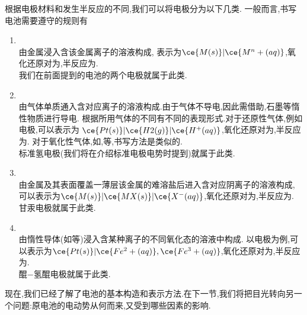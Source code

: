 \documentclass{ctexart}
\begin{document}
\begin{theorem}[6A.2.4 电极的种类]
    根据电极材料和发生半反应的不同,我们可以将电极分为以下几类.
    一般而言,书写电池需要遵守的规则有
    \begin{enumerate}[topsep=0pt,parsep=0pt,itemsep=0pt,partopsep=0pt,label=\tbf{(\arabic*)},leftmargin=*]
        \item {}\\
            由金属浸入含该金属离子的溶液构成,%
            表示为$\ce{M(s)}\vert\ce{M^n+(aq)}$,氧化还原对为,半反应为.\\
            我们在前面提到的电池的两个电极就属于此类.
        \item {}\\
            由气体单质通入含对应离子的溶液构成.由于气体不导电,因此需借助,石墨等惰性物质进行导电.%
            根据所用气体的不同有不同的表现形式.对于还原性气体,例如电极,可以表示为%
            $\ce{Pt(s)}\vert\ce{H2(g)}\vert\ce{H^+(aq)}$,氧化还原对为,半反应为.%
            对于氧化性气体,如,等,书写方法是类似的.\\
            标准氢电极(我们将在介绍标准电极电势时提到)就属于此类.
        \item {}\\
            由金属及其表面覆盖一薄层该金属的难溶盐后进入含对应阴离子的溶液构成,%
            可以表示为$\ce{M(s)}\vert\ce{MX(s)}\vert\ce{X^-(aq)}$,氧化还原对为,半反应为.\\
            甘汞电极就属于此类.
        \item {}\\
            由惰性导体(如等)浸入含某种离子的不同氧化态的溶液中构成.%
            以电极为例,可以表示为$\ce{Pt(s)}\vert\ce{Fe^2+(aq)},\ce{Fe^3+(aq)}$,氧化还原对为,半反应为.\\
            醌$-$氢醌电极就属于此类.
    \end{enumerate}
\end{theorem}
现在,我们已经了解了电池的基本构造和表示方法.在下一节,我们将把目光转向另一个问题:原电池的电动势从何而来,又受到哪些因素的影响.
\end{document}
